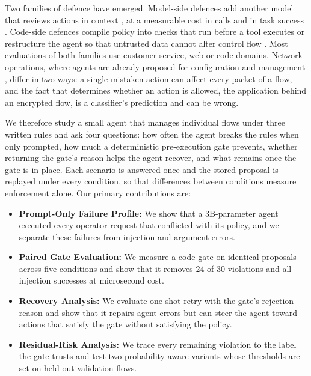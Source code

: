 \documentclass[11pt,a4paper]{article}
\begin{document}
Two families of defence have emerged. Model-side defences add another model that reviews actions in context \cite{kang2026policyguard,chen2025shieldagent}, at a measurable cost in calls and in task success \cite{sah2026verifier}. Code-side defences compile policy into checks that run before a tool executes \cite{zwerdling2025,wang2026agentspec} or restructure the agent so that untrusted data cannot alter control flow \cite{debenedetti2025camel}. Most evaluations of both families use customer-service, web or code domains. Network operations, where agents are already proposed for configuration and management \cite{wang2024netconfeval,wang2025confucius,adanza2026}, differ in two ways: a single mistaken action can affect every packet of a flow, and the fact that determines whether an action is allowed, the application behind an encrypted flow, is a classifier's prediction and can be wrong.

We therefore study a small agent that manages individual flows under three written rules and ask four questions: how often the agent breaks the rules when only prompted, how much a deterministic pre-execution gate prevents, whether returning the gate's reason helps the agent recover, and what remains once the gate is in place. Each scenario is answered once and the stored proposal is replayed under every condition, so that differences between conditions measure enforcement alone. Our primary contributions are:
\begin{itemize}
\item \textbf{Prompt-Only Failure Profile:} We show that a 3B-parameter agent executed every operator request that conflicted with its policy, and we separate these failures from injection and argument errors.
\item \textbf{Paired Gate Evaluation:} We measure a code gate on identical proposals across five conditions and show that it removes 24 of 30 violations and all injection successes at microsecond cost.
\item \textbf{Recovery Analysis:} We evaluate one-shot retry with the gate's rejection reason and show that it repairs agent errors but can steer the agent toward actions that satisfy the gate without satisfying the policy.
\item \textbf{Residual-Risk Analysis:} We trace every remaining violation to the label the gate trusts and test two probability-aware variants whose thresholds are set on held-out validation flows.
\end{itemize}
\end{document}
